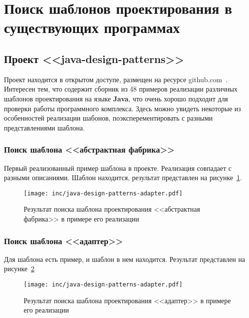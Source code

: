 \section{Поиск шаблонов проектирования в существующих программах}

\subsection{Проект <<java-design-patterns>>}

Проект находится в открытом доступе, размещен на ресурсе
github.com~\cite{java-design-patterns}.
Интересен тем, что содержит сборник из 48 примеров реализации различных
шаблонов проектирования на языке \textbf{Java},
что очень хорошо подходит для проверки работы программного комплекса.
Здесь можно увидеть некоторые из особенностей реализации шабонов,
поэксперементировать с разными представлениями шаблона.

\subsubsection*{Поиск шаблона <<абстрактная фабрика>>}

Первый реализованный пример шаблона в проекте.
Реализация совпадает с разными описаниями.
Шаблон находится, результат представлен на рисунке~\ref{fig:java-design-patterns-abstract-factory}.

\begin{figure}[!ht]
\centering
\texttt{[image: inc/java-design-patterns-adapter.pdf]}
\caption{Результат поиска шаблона проектирования <<абстрактная фабрика>> в примере его реализации}
\label{fig:java-design-patterns-abstract-factory}
\end{figure}

\subsubsection*{Поиск шаблона <<адаптер>>}

Для шаблона есть пример, и шаблон в нем находится.
Результат представлен на рисунке~\ref{fig:java-design-patterns-adapter}

\begin{figure}[!ht]
\centering
\texttt{[image: inc/java-design-patterns-adapter.pdf]}
\caption{Результат поиска шаблона проектирования <<адаптер>> в примере его реализации}
\label{fig:java-design-patterns-adapter}
\end{figure}

